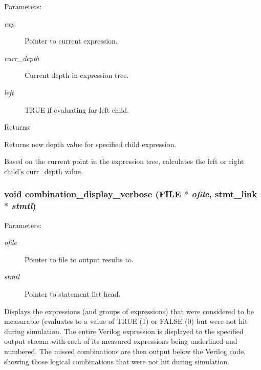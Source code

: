 \begin{Desc}
\item[Parameters: ]\par
\begin{description}
\item[{\em 
exp}]Pointer to current expression. \item[{\em 
curr\_\-depth}]Current depth in expression tree. \item[{\em 
left}]TRUE if evaluating for left child.\end{description}
\end{Desc}
\begin{Desc}
\item[Returns: ]\par
Returns new depth value for specified child expression.\end{Desc}
Based on the current point in the expression tree, calculates the left or right child's curr\_\-depth value. 
\subsubsection{\setlength{\rightskip}{0pt plus 5cm}void combination\_\-display\_\-verbose (FILE $\ast$ {\em ofile}, {\bf stmt\_\-link} $\ast$ {\em stmtl})}\label{comb_8c_a18}


\begin{Desc}
\item[Parameters: ]\par
\begin{description}
\item[{\em 
ofile}]Pointer to file to output results to. \item[{\em 
stmtl}]Pointer to statement list head.\end{description}
\end{Desc}
Displays the expressions (and groups of expressions) that were considered  to be measurable (evaluates to a value of TRUE (1) or FALSE (0) but were  not hit during simulation. The entire Verilog expression is displayed to the specified output stream with each of its measured expressions being underlined and numbered. The missed combinations are then output below the Verilog code, showing those logical combinations that were not hit during simulation. 

